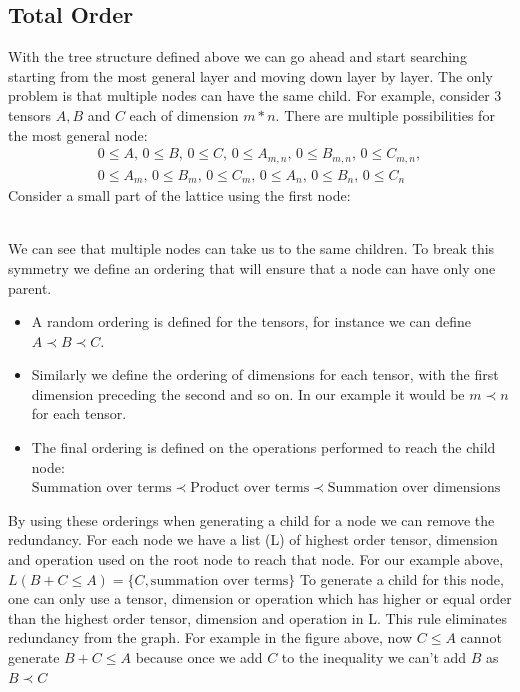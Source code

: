 \documentclass{article}
\begin{document}
\subsection{Total Order}
With the tree structure defined above we can go ahead and start searching starting from the most general layer and moving down layer by layer. The only problem is that multiple nodes can have the same child. 
For example, consider 3 tensors $A, B$ and $C$ each of dimension $m*n$. There are multiple possibilities for the most general node:
\begin{multline*}
    0 \le A,\, 0 \le B,\, 0\le C,\, 
    0 \le A_{m,n},\, 0 \le B_{m,n},\, 0\le C_{m,n},\\
    0 \le A_m,\, 0 \le B_m,\, 0\le C_m,\,
    0 \le A_n,\, 0 \le B_n,\, 0\le C_n
\end{multline*}
Consider a small part of the lattice using the first node:
\\
We can see that multiple nodes can take us to the same children. To break this symmetry we define an ordering that will ensure that a node can have only one parent.
\begin{itemize}
    \item A random ordering is defined for the tensors, for instance we can define $A \prec B \prec C$.
    \item Similarly we define the ordering of dimensions for each tensor, with the first dimension preceding the second and so on. In our example it would be $m \prec n$ for each tensor.
    \item The final ordering is defined on the operations performed to reach the child node: $\text{Summation over terms} \prec \text{Product over terms} \prec \text{Summation over dimensions}$
\end{itemize}
By using these orderings when generating a child for a node we can remove the redundancy. 
For each node we have a list (L) of highest order tensor, dimension and operation used on the root node to reach that node. For our example above, $L(B+C \le A)=\{C,\text{summation over terms}\}$
To generate a child for this node, one can only use a tensor, dimension or operation which has higher or equal order than the highest order tensor, dimension and operation in L.
This rule eliminates redundancy from the graph. For example in the figure above, now $C\le A$ cannot generate $B+C\le A$ because once we add $C$ to the inequality we can't add $B$ as $B \prec C$
\end{document}
